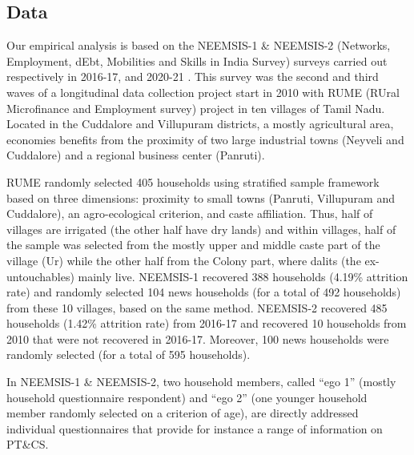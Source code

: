 \documentclass[a4paper, 11pt, onecolumn]{article}
\newcommand{\PTCS}{PT\&CS}
\begin{document}
	\subsection{Data}
	\label{subsection:data}

Our empirical analysis is based on the NEEMSIS-1 \& NEEMSIS-2 (Networks, Employment, dEbt, Mobilities and Skills in India Survey) surveys carried out respectively in 2016-17, and 2020-21 \citep{NEEMSISreport, NEEMSIS2017}.
This survey was the second and third waves of a longitudinal data collection project start in 2010 with RUME (RUral Microfinance and Employment survey) project in ten villages of Tamil Nadu.
Located in the Cuddalore and Villupuram districts, a mostly agricultural area, economies benefits from the proximity of two large industrial towns (Neyveli and Cuddalore) and a regional business center (Panruti).

RUME randomly selected 405 households using stratified sample framework based on three dimensions: proximity to small towns (Panruti, Villupuram and Cuddalore), an agro-ecological criterion, and caste affiliation.
Thus, half of villages are irrigated (the other half have dry lands) and within villages, half of the sample was selected from the mostly upper and middle caste part of the village (Ur) while the other half from the Colony part, where dalits (the ex-untouchables)  mainly live. 
NEEMSIS-1 recovered 388 households (4.19\% attrition rate) and randomly selected 104 news households (for a total of 492 households) from these 10 villages, based on the same method. 
NEEMSIS-2 recovered 485 households (1.42\% attrition rate) from 2016-17 and recovered 10 households from 2010 that were not recovered in 2016-17.
Moreover, 100 news households were randomly selected (for a total of 595 households).

In NEEMSIS-1 \& NEEMSIS-2, two household members, called ``ego 1'' (mostly household questionnaire respondent) and ``ego 2'' (one younger household member randomly selected on a criterion of age), are directly addressed individual questionnaires that provide for instance a range of information on \PTCS.
\end{document}
